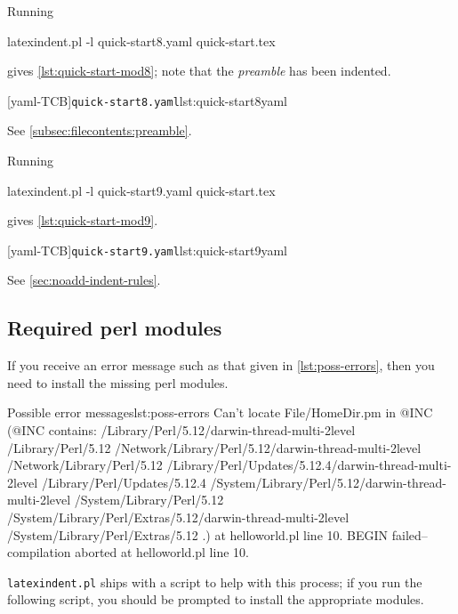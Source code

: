 \documentclass[10pt]{article}
\begin{document}
 \begin{example}
 Running

 \begin{commandshell}
latexindent.pl -l quick-start8.yaml quick-start.tex
\end{commandshell}

 gives \cref{lst:quick-start-mod8}; note that the \emph{preamble} has been indented.

 \begin{cmhtcbraster}
  [yaml-TCB]{\texttt{quick-start8.yaml}}{lst:quick-start8yaml}
 \end{cmhtcbraster}

 See \cref{subsec:filecontents:preamble}.

 \end{example}

 \begin{example}
 Running

 \begin{commandshell}
latexindent.pl -l quick-start9.yaml quick-start.tex
\end{commandshell}

 gives \cref{lst:quick-start-mod9}.

 \begin{cmhtcbraster}
  [yaml-TCB]{\texttt{quick-start9.yaml}}{lst:quick-start9yaml}
 \end{cmhtcbraster}

 See \cref{sec:noadd-indent-rules}.
 \end{example}

\subsection{Required perl modules}
 If you receive an error message such as that given in
 \cref{lst:poss-errors}, then you need to install the missing perl modules.
 \begin{cmhlistings}[style=tcblatex,language=Perl]{Possible error messages}{lst:poss-errors}
Can't locate File/HomeDir.pm in @INC (@INC contains: /Library/Perl/5.12/darwin-thread-multi-2level /Library/Perl/5.12 /Network/Library/Perl/5.12/darwin-thread-multi-2level /Network/Library/Perl/5.12 /Library/Perl/Updates/5.12.4/darwin-thread-multi-2level /Library/Perl/Updates/5.12.4 /System/Library/Perl/5.12/darwin-thread-multi-2level /System/Library/Perl/5.12 /System/Library/Perl/Extras/5.12/darwin-thread-multi-2level /System/Library/Perl/Extras/5.12 .) at helloworld.pl line 10.
BEGIN failed--compilation aborted at helloworld.pl line 10.
\end{cmhlistings}
 \texttt{latexindent.pl} ships with a script to help with this process; if you run the
 following script, you should be prompted to install the appropriate modules.
\end{document}
